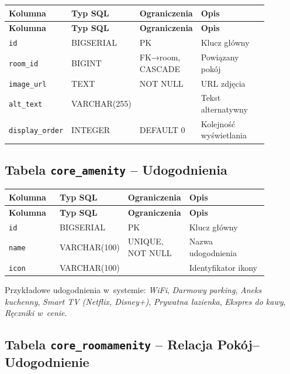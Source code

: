 \documentclass[12pt,a4paper]{article}
\begin{document}
\begin{longtable}{p{0.2\linewidth}p{0.18\linewidth}p{0.18\linewidth}p{0.32\linewidth}}
\toprule
\textbf{Kolumna} & \textbf{Typ SQL} & \textbf{Ograniczenia} & \textbf{Opis} \\
\midrule
\endfirsthead
\toprule
\textbf{Kolumna} & \textbf{Typ SQL} & \textbf{Ograniczenia} & \textbf{Opis} \\
\midrule
\endhead
\texttt{id} & BIGSERIAL & PK & Klucz główny \\
\texttt{room\_id} & BIGINT & FK→room, CASCADE & Powiązany pokój \\
\texttt{image\_url} & TEXT & NOT NULL & URL zdjęcia \\
\texttt{alt\_text} & VARCHAR(255) & & Tekst alternatywny \\
\texttt{display\_order} & INTEGER & DEFAULT 0 & Kolejność wyświetlania \\
\bottomrule
\end{longtable}

\subsection{Tabela \texttt{core\_amenity} -- Udogodnienia}

\begin{longtable}{p{0.2\linewidth}p{0.18\linewidth}p{0.18\linewidth}p{0.32\linewidth}}
\toprule
\textbf{Kolumna} & \textbf{Typ SQL} & \textbf{Ograniczenia} & \textbf{Opis} \\
\midrule
\endfirsthead
\toprule
\textbf{Kolumna} & \textbf{Typ SQL} & \textbf{Ograniczenia} & \textbf{Opis} \\
\midrule
\endhead
\texttt{id} & BIGSERIAL & PK & Klucz główny \\
\texttt{name} & VARCHAR(100) & UNIQUE, NOT NULL & Nazwa udogodnienia \\
\texttt{icon} & VARCHAR(100) & & Identyfikator ikony \\
\bottomrule
\end{longtable}

Przykładowe udogodnienia w~systemie: \emph{WiFi}, \emph{Darmowy parking},
\emph{Aneks kuchenny}, \emph{Smart TV (Netflix, Disney+)},
\emph{Prywatna łazienka}, \emph{Ekspres do kawy}, \emph{Ręczniki w~cenie}.

\subsection{Tabela \texttt{core\_roomamenity} -- Relacja Pokój--Udogodnienie}
\end{document}
